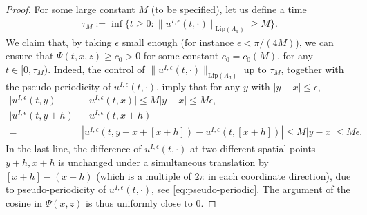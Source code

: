 \documentclass[a4paper,11pt]{amsart}
\newcommand{\red}[1]{{#1}}
\newcommand{\ep}{\epsilon}
\numberwithin{equation}{section}
\numberwithin{theorem}{section}
\theoremstyle{definition}
\begin{document}
\begin{proof}
For some large constant $M$ (to be specified), let us define a time 
\begin{align*}
\tau_M:=\inf\big\{t\ge0: \|u^{I,\ep}(t, \cdot)\|_{\text{Lip}(\Lambda_d)}\ge M\big\}.
\end{align*}
We claim that, by taking $\ep$ small enough (for instance $\ep<\pi/(4M)$), we can ensure that $\Psi(t, x, z)\geq c_0>0$ for some constant $c_0=c_0(M)$, for any $t\in[0,\tau_M)$. Indeed, \red{the control of $\|u^{I,\ep}(t, \cdot)\|_{\text{Lip}(\Lambda_d)}$ up to $\tau_M$, together with the pseudo-periodicity of $u^{I,\ep}(t,\cdot)$, imply that for any $y$ with $|y-x|\le\ep$,
\begin{align*}
|u^{I,\ep}(t,y)&-u^{I,\ep}(t,x)|\le M|y-x|\le M\ep,\\
|u^{I,\ep}(t,y+h)&-u^{I,\ep}(t,x+h)|\\
=&|u^{I,\ep}(t, y-x+[x+h])-u^{I,\ep}(t,[x+h])|\le M|y-x|\le M\ep.
\end{align*}
In the last line, the difference of $u^{I,\ep}(t,\cdot)$ at two different spatial points $y+h, x+h$ is unchanged under a simultaneous translation by $[x+h]-(x+h)$ (which is a multiple of $2\pi$ in each coordinate direction), due to pseudo-periodicity of $u^{I,\ep}(t,\cdot)$, see \eqref{eq:pseudo-periodic}.} The argument of the cosine in $\Psi(x,z )$ is thus uniformly close to $0$. 


\end{proof}
\end{document}
